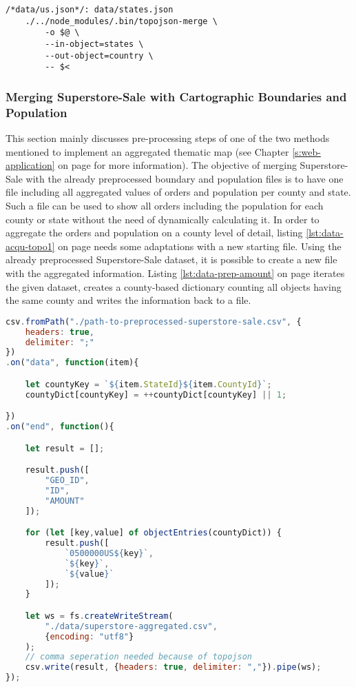 \begin{lstlisting}[style={makefile}, caption={Make task for converting state boundaries to a county boundary}, label={lst:data-acqu-topo3}]
/*data/us.json*/: data/states.json
    ./../node_modules/.bin/topojson-merge \
        -o $@ \
        --in-object=states \
        --out-object=country \
        -- $<
\end{lstlisting}

\subsubsection{Merging Superstore-Sale with Cartographic Boundaries and Population}
This section mainly discusses pre-processing steps of one of the two methods mentioned to implement an aggregated thematic map (see Chapter \ref{s:web-application} on page \pageref{s:web-application} for more information). The objective of merging Superstore-Sale with the already preprocessed boundary and population files is to have one file including all aggregated values of orders and population per county and state. Such a file can be used to show all orders including the population for each county or state without the need of dynamically calculating it.
In order to aggregate the orders and population on a county level of detail, listing \ref{lst:data-acqu-topo1} on page \pageref{lst:data-acqu-topo1} needs some adaptations with a new starting file. Using the already preprocessed Superstore-Sale dataset, it is possible to create a new file with the aggregated information. Listing \ref{lst:data-prep-amount} on page \pageref{lst:data-prep-amount} iterates the given dataset, creates a county-based dictionary counting all objects having the same county and writes the information back to a file.

\begin{lstlisting}[language=JavaScript, caption={Creating the file containing aggregation information}, label={lst:data-prep-amount}]
csv.fromPath("./path-to-preprocessed-superstore-sale.csv", {
    headers: true,
    delimiter: ";"
})
.on("data", function(item){

    let countyKey = `${item.StateId}${item.CountyId}`;
    countyDict[countyKey] = ++countyDict[countyKey] || 1;

})
.on("end", function(){

    let result = [];

    result.push([
        "GEO_ID",
        "ID",
        "AMOUNT"
    ]);

    for (let [key,value] of objectEntries(countyDict)) {
        result.push([
            `0500000US${key}`,
            `${key}`,
            `${value}`
        ]);
    }

    let ws = fs.createWriteStream(
        "./data/superstore-aggregated.csv",
        {encoding: "utf8"}
    );
    // comma seperation needed because of topojson
    csv.write(result, {headers: true, delimiter: ","}).pipe(ws);
});
\end{lstlisting}

